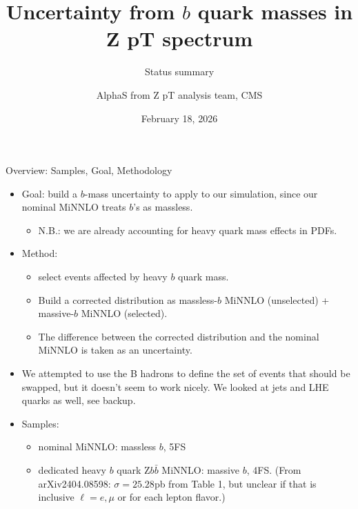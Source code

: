 \documentclass[10pt]{beamer}
\title{Uncertainty from $b$ quark masses in Z pT spectrum}
\subtitle{Status summary}
\author{AlphaS from Z pT analysis team, CMS}
\date{February 18, 2026}
\begin{document}
\frame{\titlepage}

\begin{frame}{Overview: Samples, Goal, Methodology}
\begin{itemize}
  \item Goal: build a $b$-mass uncertainty to apply to our simulation, since our nominal MiNNLO treats $b$'s as massless.
  \begin{itemize}
    \item N.B.: we are already accounting for heavy quark mass effects in PDFs.
  \end{itemize}
  \item Method:
  \begin{itemize}
    \item select events affected by heavy $b$ quark mass.
    \item Build a corrected distribution as massless-$b$ MiNNLO (unselected) + massive-$b$ MiNNLO (selected).
    \item The difference between the corrected distribution and the nominal MiNNLO is taken as an uncertainty.
  \end{itemize}
  \item We attempted to use the B hadrons to define the set of events that should be swapped, but it doesn't seem to work nicely. We looked at jets and LHE quarks as well, see backup.
  \item Samples:
  \begin{itemize}
    \item nominal MiNNLO: massless $b$, 5FS
    \item dedicated heavy $b$ quark Z$b\bar{b}$ MiNNLO: massive $b$, 4FS. (From arXiv2404.08598: $\sigma=25.28$pb from Table 1, but unclear if that is inclusive $\ell=e,\mu$ or for each lepton flavor.)
  \end{itemize}
\end{itemize}
\end{frame}
\end{document}
